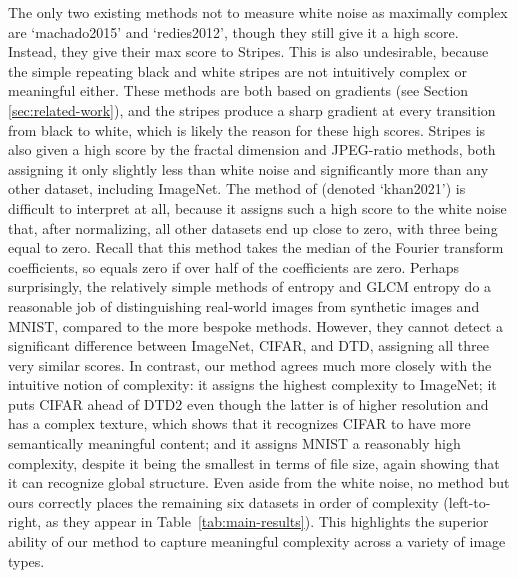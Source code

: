 \documentclass[a4paper,fleqn]{cas-sc}
\theoremstyle{remark}
\begin{document}
The only two existing methods not to measure white noise as maximally complex are `machado2015' and `redies2012', though they still give it a high score. Instead, they give their max score to Stripes. This is also undesirable, because the simple repeating black and white stripes are not intuitively complex or meaningful either. These methods are both based on gradients (see Section \ref{sec:related-work}), and the stripes produce a sharp gradient at every transition from black to white, which is likely the reason for these high scores. 
Stripes is also given a high score by the fractal dimension and JPEG-ratio methods, both assigning it only slightly less than white noise and significantly more than any other dataset, including ImageNet. 
The method of \citep{khan2022leveraging} (denoted `khan2021') is difficult to interpret at all, because it assigns such a high score to the white noise that, after normalizing, all other datasets end up close to zero, with three being equal to zero. Recall that this method takes the median of the Fourier transform coefficients, so equals zero if over half of the coefficients are zero. 
Perhaps surprisingly, the relatively simple methods of entropy and GLCM entropy do a reasonable job of distinguishing real-world images from synthetic images and MNIST, compared to the more bespoke methods. However, they cannot detect a significant difference between ImageNet, CIFAR, and DTD, assigning all three very similar scores. In contrast, our method agrees much more closely with the intuitive notion of complexity: it assigns the highest complexity to ImageNet; it puts CIFAR ahead of DTD2 even though the latter is of higher resolution and has a complex texture, which shows that it recognizes CIFAR to have more semantically meaningful content; and it assigns MNIST a reasonably high complexity, despite it being the smallest in terms of file size, again showing that it can recognize global structure. Even aside from the white noise, no method but ours correctly places the remaining six datasets in order of complexity (left-to-right, as they appear in Table~\ref{tab:main-results}). This highlights the superior ability of our method to capture meaningful complexity across a variety of image types. 
\end{document}
